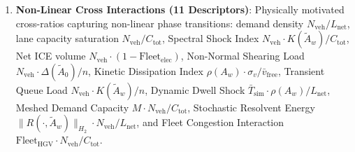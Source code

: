 \documentclass[journal]{IEEEtran}
\begin{document}
\begin{enumerate}
    \begin{enumerate}
        \item Unweighted and weighted Perron-Frobenius spectral radii $\rho(A_0)$ and $\rho(A_w)$ from \eqref{eq:adjacency} (2 descriptors).
        \item Spectral gap $\Delta\lambda = |\lambda_1(\tilde{A}_0) - \lambda_2(\tilde{A}_0)|$, where $\lambda_1, \lambda_2 \in \mathbb{C}$ are the top 2 leading eigenvalues of $\tilde{A}_0$ sorted by descending modulus (1 descriptor).
        \item Top-5 leading eigenvalue moduli $|\lambda_1(\tilde{A}_w)|, \dots, |\lambda_5(\tilde{A}_w)|$ of the impedance-weighted transition matrix $\tilde{A}_w$ defined in \eqref{eq:normalized_A} (5 descriptors).
        \item Commutator non-normality norms $\Delta(\tilde{A}_0)$ and $\Delta(\tilde{A}_w)$ from \eqref{eq:commutator} (2 descriptors).
        \item Kreiss transient growth constants $K(\tilde{A}_0)$ and $K(\tilde{A}_w)$ from \eqref{eq:kreiss} (2 descriptors).
        \item Discrete Hardy $H_2$ resolvent norms $\|R(\cdot, \tilde{A}_0)\|_{H_2}$ and $\|R(\cdot, \tilde{A}_w)\|_{H_2}$ from \eqref{eq:hardy_lyapunov} (2 descriptors).
        \item $\epsilon$-pseudospectral radii $\alpha_{0.01}(\tilde{A}_0)$ and $\alpha_{0.01}(\tilde{A}_w)$ from \eqref{eq:pseudospectrum} with $\epsilon = 0.01$ (2 descriptors).
        \item First- and second-order Kato perturbation derivatives $\lambda^{(1)}(A_0), \lambda^{(2)}(A_0), \lambda^{(1)}(A_w), \lambda^{(2)}(A_w)$ defined in \eqref{eq:kato_1}--\eqref{eq:kato_2} (4 descriptors).
    \end{enumerate}
    \item \textbf{Non-Linear Cross Interactions (11 Descriptors)}: Physically motivated cross-ratios capturing non-linear phase transitions: demand density $N_{\text{veh}} / L_{\text{net}}$, lane capacity saturation $N_{\text{veh}} / C_{\text{tot}}$, Spectral Shock Index $N_{\text{veh}} \cdot K(\tilde{A}_w) / C_{\text{tot}}$, Net ICE volume $N_{\text{veh}} \cdot (1 - \text{Fleet}_{\text{elec}})$, Non-Normal Shearing Load $N_{\text{veh}} \cdot \Delta(\tilde{A}_0) / n$, Kinetic Dissipation Index $\rho(A_w) \cdot \sigma_v / \bar{v}_{\text{free}}$, Transient Queue Load $N_{\text{veh}} \cdot K(\tilde{A}_w) / n$, Dynamic Dwell Shock $\bar{T}_{\text{sim}} \cdot \rho(A_w) / L_{\text{net}}$, Meshed Demand Capacity $M \cdot N_{\text{veh}} / C_{\text{tot}}$, Stochastic Resolvent Energy $\|R(\cdot, \tilde{A}_w)\|_{H_2} \cdot N_{\text{veh}} / L_{\text{net}}$, and Fleet Congestion Interaction $\text{Fleet}_{\text{HGV}} \cdot N_{\text{veh}} / C_{\text{tot}}$.
\end{enumerate}
\end{document}
